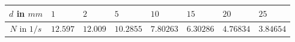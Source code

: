 \begin{tabular}{c|*{7}{*{1}{l}}}
$d$ in ${\si{mm}}$ & $1$ & $2$ & $5$ & $10$ & $15$ & $20$ & $25$ \\ \hline
$N$ in ${\si{1/s}}$ & $12.597$ & $12.009$ & $10.2855$ & $7.80263$ & $6.30286$ & $4.76834$ & $3.84654$\end{tabular}

